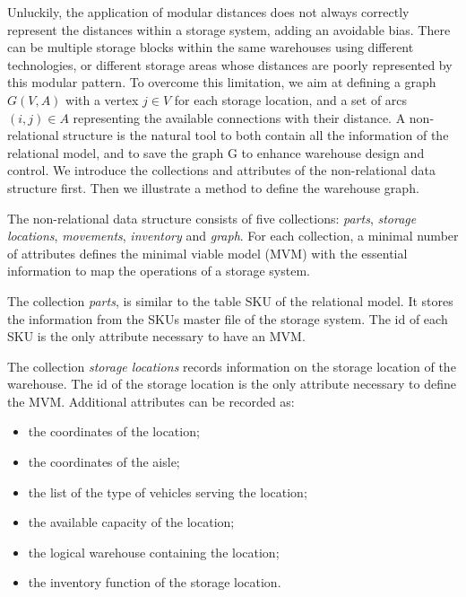 Unluckily, the application of modular distances does not always correctly represent the distances within a storage system, adding an avoidable bias. There can be multiple storage blocks within the same warehouses using different technologies, or different storage areas whose distances are poorly represented by this modular pattern. To overcome this limitation, we aim at defining a graph $G(V,A)$ with a vertex $j\in V$ for each  storage location, and a set of arcs $\left(i,j\right)\in A$ representing the available connections with their distance. A non-relational structure is the natural tool to both contain all the information of the relational model, and to save the graph G to enhance warehouse design and control. We introduce the collections and attributes of the non-relational data structure first. Then we illustrate a method to define the warehouse graph. \par

The non-relational data structure consists of five collections: \textit{parts}, \textit{storage locations}, \textit{movements}, \textit{inventory} and \textit{graph}. For each collection, a minimal number of attributes defines the minimal viable model (MVM) with the essential information to map the operations of a storage system. \par

The collection \textit{parts}, is similar to the table SKU of the relational model. It stores the information from the SKUs master file of the storage system. The id of each SKU is the only attribute necessary to have an MVM. \par

The collection \textit{storage locations} records information on the storage location of the warehouse. The id of the storage location is the only attribute necessary to define the MVM. Additional attributes can be recorded as:

\begin{itemize}
    \item the coordinates of the location; 
    \item the coordinates of the aisle; 
    \item the list of the type of vehicles serving the location; 
    \item the available capacity of the location; 
    \item the logical warehouse containing the location;
    \item the inventory function of the storage location.
\end{itemize}

